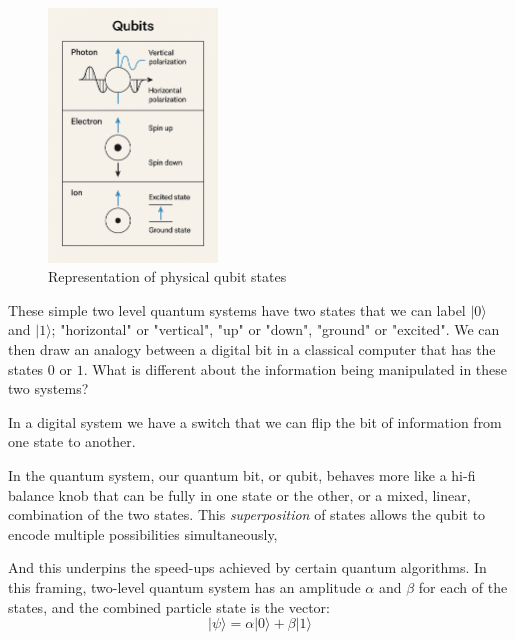 \begin{figure}[ht]
	\begin{adjustbox}{center}
		\includegraphics[width=0.4\textwidth, inner]{figures/physical_qubits_2.png}
	\end{adjustbox}
	\vspace{4pt}
	\caption{Representation of physical qubit states} %
	\label{fig:phys_qubit}
\end{figure}

These simple two level quantum systems have two states that we can label $\lvert0\rangle$ and $\lvert1\rangle$;
"horizontal" or "vertical", "up" or "down", "ground" or "excited".
We can then draw an analogy between a digital bit in a classical computer that has the states $0$ or $1$.
What is different about the information being manipulated in these two systems?

In a digital system we have a switch that we can flip the bit of information from one state to another.

In the quantum system, our quantum bit, or qubit, behaves more like a hi-fi balance knob 
that can be fully in one state or the other, or a mixed, linear, combination of the two states.
This \emph{superposition} of states allows the qubit to encode multiple possibilities simultaneously, 

And this underpins the speed-ups achieved by certain quantum algorithms\cite{Nielsen:2010}.
In this framing, two-level quantum system has an amplitude  $\alpha$ and $\beta$  for each of the states,
and the combined particle state is the vector: 
$$\lvert\psi\rangle = \alpha \lvert0\rangle + \beta \lvert1\rangle $$

